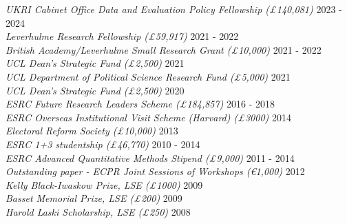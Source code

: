 \documentclass[centered]{res}
\begin{document}
\begin{resume}
 {
 {\sl UKRI Cabinet Office Data and Evaluation Policy Fellowship (\pounds 140,081)} \hfill 2023 - 2024 \\
 {\sl Leverhulme Research Fellowship (\pounds 59,917)} \hfill 2021 - 2022 \\
{\sl British Academy/Leverhulme Small Research Grant  (\pounds 10,000)} \hfill 2021 - 2022 \\
{\sl UCL Dean's Strategic Fund (\pounds 2,500)} \hfill 2021 \\
{\sl UCL Department of Political Science Research Fund (\pounds 5,000)} \hfill 2021 \\
{\sl UCL Dean's Strategic Fund (\pounds 2,500)} \hfill 2020 \\
{\sl ESRC Future Research Leaders Scheme (\pounds 184,857)} \hfill 2016 - 2018 \\
{\sl ESRC Overseas Institutional Visit Scheme (Harvard) (\pounds 3000)} \hfill 2014 \\
{\sl Electoral Reform Society (\pounds 10,000)} \hfill 2013 \\
{\sl ESRC 1+3 studentship (\pounds 46,770)} \hfill 2010 - 2014 \\
{\sl ESRC Advanced Quantitative Methods Stipend (\pounds 9,000)} \hfill 2011 - 2014 \\
{\sl Outstanding paper - ECPR Joint Sessions of Workshops (\euro 1,000)} \hfill 2012 \\
{\sl Kelly Black-Iwaskow Prize, LSE (\pounds 1000)} \hfill 2009 \\
{\sl Basset Memorial Prize, LSE (\pounds 200)} \hfill 2009 \\
\sl Harold Laski Scholarship, LSE (\pounds 250)} \hfill 2008 






\end{resume}
\end{document}
